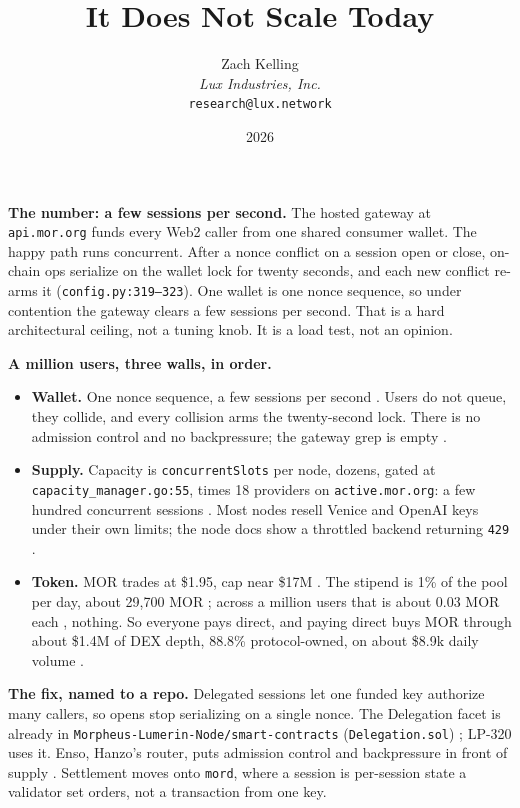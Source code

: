 \documentclass[11pt,a4paper]{article}
\title{It Does Not Scale Today}
\author{Zach Kelling\\\textit{Lux Industries, Inc.}\\\texttt{research@lux.network}}
\date{2026}
\newcommand{\code}[1]{\texttt{\small #1}}
\newcommand{\prov}[1]{{\color{muted}\scriptsize\sffamily[#1]}}
\begin{document}
\luxcoverpage
\sloppy

\par
\vspace{0.9ex}

\noindent\textbf{The number: a few sessions per second.} \prov{verified}
The hosted gateway at \code{api.mor.org} funds every Web2 caller from one shared consumer
wallet. The happy path runs concurrent. After a nonce conflict on a session open or close,
on-chain ops serialize on the wallet lock for twenty seconds, and each new conflict re-arms it
(\code{config.py:319--323}). One wallet is one nonce sequence, so under contention the gateway
clears a few sessions per second. That is a hard architectural ceiling, not a tuning knob. It is
a load test, not an opinion.

\vspace{0.4ex}
\noindent\textbf{A million users, three walls, in order.}
\begin{itemize}
\item \textbf{Wallet.} One nonce sequence, a few sessions per second \prov{verified}. Users do
      not queue, they collide, and every collision arms the twenty-second lock. There is no
      admission control and no backpressure; the gateway grep is empty \prov{verified}.
\item \textbf{Supply.} Capacity is \code{concurrentSlots} per node, dozens, gated at
      \code{capacity\_manager.go:55}, times 18 providers on \code{active.mor.org}: a few hundred
      concurrent sessions \prov{verified}. Most nodes resell Venice and OpenAI keys under their
      own limits; the node docs show a throttled backend returning \code{429} \prov{verified}.
\item \textbf{Token.} MOR trades at \$1.95, cap near \$17M \prov{verified}. The stipend is 1\% of
      the pool per day, about 29{,}700 MOR \prov{derived}; across a million users that is about
      0.03 MOR each \prov{illustrative}, nothing. So everyone pays direct, and paying direct buys
      MOR through about \$1.4M of DEX depth, 88.8\% protocol-owned, on about \$8.9k daily volume
      \prov{verified}.
\end{itemize}

\vspace{0.2ex}
\noindent\textbf{The fix, named to a repo.}
Delegated sessions let one funded key authorize many callers, so opens stop serializing on a
single nonce. The Delegation facet is already in \code{Morpheus-Lumerin-Node/smart-contracts}
(\code{Delegation.sol}) \prov{verified}; LP-320 uses it. Enso, Hanzo's router, puts admission
control and backpressure in front of supply \prov{verified}. Settlement moves onto \code{mord},
where a session is per-session state a validator set orders, not a transaction from one key.
\end{document}
